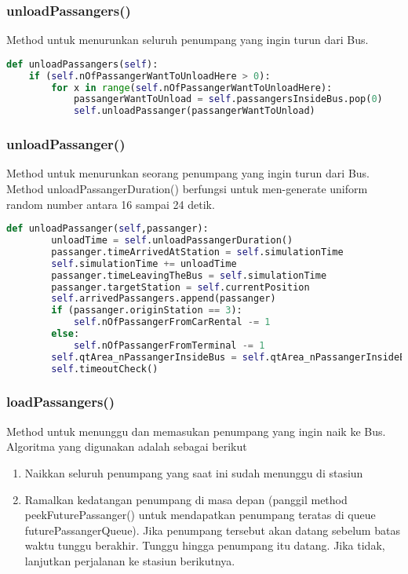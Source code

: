 \documentclass{article}
\begin{document}
\subsubsection{unloadPassangers()}
Method untuk menurunkan seluruh penumpang yang ingin turun dari Bus.
\begin{lstlisting}[language=Python]
def unloadPassangers(self):
	if (self.nOfPassangerWantToUnloadHere > 0):
		for x in range(self.nOfPassangerWantToUnloadHere):
			passangerWantToUnload = self.passangersInsideBus.pop(0)
			self.unloadPassanger(passangerWantToUnload)
\end{lstlisting}

\subsubsection{unloadPassanger()}
Method untuk menurunkan seorang penumpang yang ingin turun dari Bus. Method unloadPassangerDuration() berfungsi untuk men-generate uniform random number antara 16 sampai 24 detik.
\begin{lstlisting}[language=Python]
def unloadPassanger(self,passanger):
		unloadTime = self.unloadPassangerDuration()
		passanger.timeArrivedAtStation = self.simulationTime
		self.simulationTime += unloadTime
		passanger.timeLeavingTheBus = self.simulationTime
		passanger.targetStation = self.currentPosition
		self.arrivedPassangers.append(passanger)	
		if (passanger.originStation == 3):
			self.nOfPassangerFromCarRental -= 1
		else:
			self.nOfPassangerFromTerminal -= 1
		self.qtArea_nPassangerInsideBus = self.qtArea_nPassangerInsideBus + (self.simulationTime - passanger.timeEnteringTheBus)
		self.timeoutCheck()
\end{lstlisting}

\subsubsection{loadPassangers()}
Method untuk menunggu dan memasukan penumpang yang ingin naik ke Bus. Algoritma yang digunakan adalah sebagai berikut

\begin{enumerate}
	\item Naikkan seluruh penumpang yang saat ini sudah menunggu di stasiun
	\item Ramalkan kedatangan penumpang di masa depan (panggil method peekFuturePassanger() untuk mendapatkan penumpang teratas di queue futurePassangerQueue). Jika penumpang tersebut akan datang sebelum batas waktu tunggu berakhir. Tunggu hingga penumpang itu datang. Jika tidak, lanjutkan perjalanan ke stasiun berikutnya.
\end{enumerate}
\end{document}
